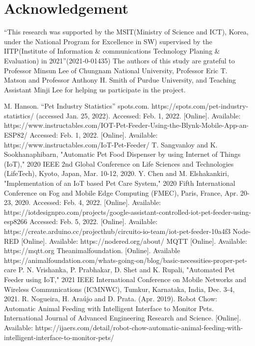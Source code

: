 \documentclass[conference]{IEEEtran}
\begin{document}
\section{Acknowledgement}
“This research was supported by the MSIT(Ministry of Science and ICT), Korea, under the National Program for Excellence in SW) supervised by the IITP(Institute of Information \& communications Technology Planing \& Evaluation) in 2021”(2021-0-01435)
The authors of this study are grateful to Professor Minsun Lee of Chungnam National University, Professor Eric T. Matson and Professor Anthony H. Smith of Purdue University, and Teaching Assistant Minji Lee for helping us participate in the project.

\begin{thebibliography}{00}
M.  Hanson.  “Pet  Industry  Statistics”  spots.com.  https://spots.com/pet-industry-statistics/ (accessed Jan. 25, 2022). 
Accessed: Feb. 1, 2022. [Online]. Available: https://www.instructables.com/IOT-Pet-Feeder-Using-the-Blynk-Mobile-App-an-ESP82/
Accessed: Feb. 1, 2022. [Online]. Available: https://www.instructables.com/IoT-Pet-Feeder/
T. Sangvanloy and K. Sookhanaphibarn, "Automatic Pet Food Dispenser by using Internet of Things (IoT)," 2020 IEEE 2nd Global Conference on Life Sciences and Technologies (LifeTech), Kyoto, Japan, Mar. 10-12, 2020.
Y. Chen and M. Elshakankiri, "Implementation of an IoT based Pet Care System," 2020 Fifth International Conference on Fog and Mobile Edge Computing (FMEC), Paris, France, Apr. 20-23, 2020.
Accessed: Feb. 4, 2022. [Online]. Available: https://iotdesignpro.com/projects/google-assistant-controlled-iot-pet-feeder-using-esp8266
Accessed: Feb. 5, 2022. [Online]. Available: https://create.arduino.cc/projecthub/circuito-io-team/iot-pet-feeder-10a4f3
Node-RED [Online]. Available: https://nodered.org/about/
MQTT [Online]. Available: https://mqtt.org
Theanimalfoundation. [Online]. Available https://animalfoundation.com/whats-going-on/blog/basic-necessities-proper-pet-care
P. N. Vrishanka, P. Prabhakar, D. Shet and K. Rupali, "Automated Pet Feeder using IoT," 2021 IEEE International Conference on Mobile Networks and Wireless Communications (ICMNWC), Tumkur, Karnataka, India, Dec. 3-4, 2021.
R. Nogueira, H. Araújo and D. Prata. (Apr. 2019). Robot Chow: Automatic Animal Feeding with Intelligent Interface to Monitor Pets. International Journal of Advanced Engineering Research and Science. [Online]. Available: https://ijaers.com/detail/robot-chow-automatic-animal-feeding-with-intelligent-interface-to-monitor-pets/

\end{thebibliography}
\end{document}
